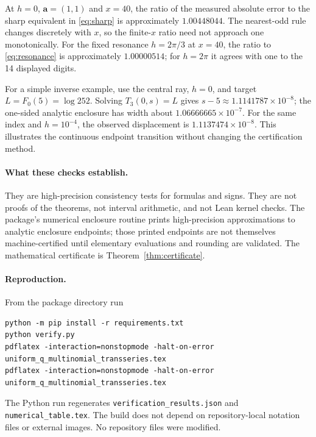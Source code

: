 \documentclass[11pt,a4paper]{article}
\numberwithin{equation}{section}
\theoremstyle{definition}\newtheorem{definition}[theorem]{Definition}
\theoremstyle{remark}\newtheorem{remark}[theorem]{Remark}
\newcommand{\avec}{\boldsymbol a}
\begin{document}
\begin{table}[htbp]
\centering\small

\caption{Central-ray least-term checks. The target is the exact finite-product
value at the displayed integral $x$ (the gamma value for $h=0$). Entries are
rounded numerical observations, not outward-rounded interval endpoints.}
\label{tab:numeric}
\end{table}

At $h=0$, $\avec=(1,1)$ and $x=40$, the ratio of the measured absolute error to
the sharp equivalent in \eqref{eq:sharp} is approximately $1.00448044$.
The nearest-odd rule changes discretely with $x$, so the finite-$x$ ratio need
not approach one monotonically. For the fixed resonance $h=2\pi/3$ at
$x=40$, the ratio to \eqref{eq:resonance} is approximately $1.00000514$;
for $h=2\pi$ it agrees with one to the 14 displayed digits.

For a simple inverse example, use the central ray, $h=0$, and target
$L=F_0(5)=\log252$. Solving $T_3(0,s)=L$ gives
$s-5\approx1.1141787\times10^{-8}$; the one-sided analytic enclosure has
width about $1.06666665\times10^{-7}$. For the same index and $h=10^{-4}$,
the observed displacement is $1.1137474\times10^{-8}$. This illustrates the
continuous endpoint transition without changing the certification method.

\paragraph{What these checks establish.}
They are high-precision consistency tests for formulas and signs. They are
not proofs of the theorems, not interval arithmetic, and not Lean kernel
checks. The package's numerical enclosure routine prints high-precision
approximations to analytic enclosure endpoints; those printed endpoints are
not themselves machine-certified until elementary evaluations and rounding
are validated. The mathematical certificate is Theorem~\ref{thm:certificate}.

\paragraph{Reproduction.}
From the package directory run
\begin{lstlisting}
python -m pip install -r requirements.txt
python verify.py
pdflatex -interaction=nonstopmode -halt-on-error uniform_q_multinomial_transseries.tex
pdflatex -interaction=nonstopmode -halt-on-error uniform_q_multinomial_transseries.tex
\end{lstlisting}
The Python run regenerates \texttt{verification\_results.json} and
\texttt{numerical\_table.tex}. The build does not depend on repository-local
notation files or external images. No repository files were modified.
\end{document}
